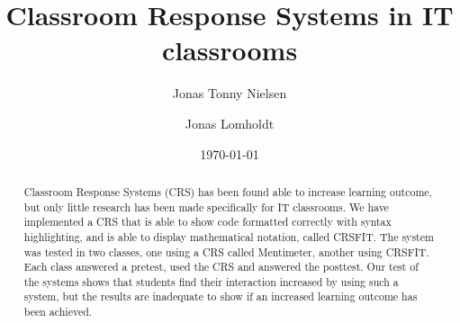 \documentclass{article}
\title{Classroom Response Systems in IT classrooms}
\author{Jonas Tonny Nielsen \and Jonas Lomholdt}
\date{\today}
\begin{document}
\maketitle

\begin{abstract}
Classroom Response Systems (CRS) has been found able to increase learning outcome, but only little research has been made specifically for IT classrooms. We have implemented a CRS that is able to show code formatted correctly with syntax highlighting, and is able to display mathematical notation, called CRSFIT. The system was tested in two classes, one using a CRS called Mentimeter, another using CRSFIT. Each class answered a pretest, used the CRS and answered the posttest. Our test of the systems shows that students find their interaction increased by using such a system, but the results are inadequate to show if an increased learning outcome has been achieved.
\end{abstract}

\tableofcontents

\clearpage
\listoffigures

\clearpage
\listoftables

\clearpage
\lstlistoflistings

\clearpage
\listoftodos


 \clearpage

 \clearpage
 \clearpage
 \clearpage
 \clearpage
 \clearpage
 \clearpage



\clearpage

\end{document}

